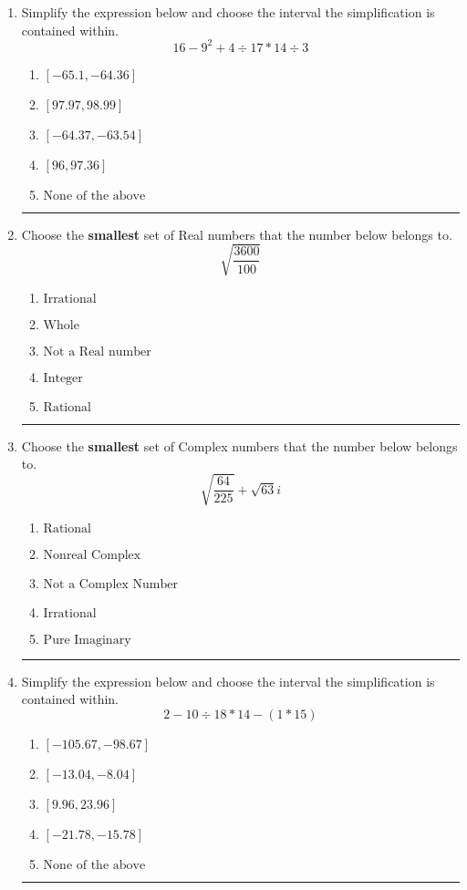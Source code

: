 \documentclass[14pt]{extbook}
\newcommand{\litem}[1]{\item#1\hspace*{-1cm}\rule{\textwidth}{0.4pt}}
\begin{document}
\begin{enumerate}
\litem{
Simplify the expression below and choose the interval the simplification is contained within.\[ 16 - 9^2 + 4 \div 17 * 14 \div 3 \]\begin{enumerate}[label=\Alph*.]
\item \( [-65.1, -64.36] \)
\item \( [97.97, 98.99] \)
\item \( [-64.37, -63.54] \)
\item \( [96, 97.36] \)
\item \( \text{None of the above} \)

\end{enumerate} }
\litem{
Choose the \textbf{smallest} set of Real numbers that the number below belongs to.\[ \sqrt{\frac{3600}{100}} \]\begin{enumerate}[label=\Alph*.]
\item \( \text{Irrational} \)
\item \( \text{Whole} \)
\item \( \text{Not a Real number} \)
\item \( \text{Integer} \)
\item \( \text{Rational} \)

\end{enumerate} }
\litem{
Choose the \textbf{smallest} set of Complex numbers that the number below belongs to.\[ \sqrt{\frac{64}{225}}+\sqrt{63} i \]\begin{enumerate}[label=\Alph*.]
\item \( \text{Rational} \)
\item \( \text{Nonreal Complex} \)
\item \( \text{Not a Complex Number} \)
\item \( \text{Irrational} \)
\item \( \text{Pure Imaginary} \)

\end{enumerate} }
\litem{
Simplify the expression below and choose the interval the simplification is contained within.\[ 2 - 10 \div 18 * 14 - (1 * 15) \]\begin{enumerate}[label=\Alph*.]
\item \( [-105.67, -98.67] \)
\item \( [-13.04, -8.04] \)
\item \( [9.96, 23.96] \)
\item \( [-21.78, -15.78] \)
\item \( \text{None of the above} \)


\end{enumerate}}
\end{enumerate}
\end{document}
